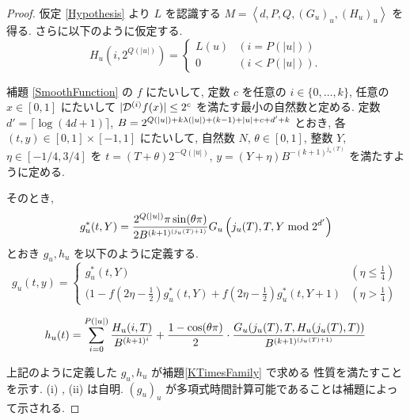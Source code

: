  \begin{proof}
  仮定 \ref{Hypothesis} より $L$ を認識する 
  $M = \left< d, P, Q,(G_u)_u,(H_u)_u \right>$
  を得る.
  さらに以下のように仮定する.
  \begin{equation}
   H_u(i, 2^{Q(|u|)}) = \begin{cases}
			L(u) & (i=P(|u|)) \\
			0 & (i<P(|u|)).
			\end{cases}
  \end{equation}

    補題 \ref{SmoothFunction} の $f$ にたいして, 
 定数 $c$ を任意の $i \in \{0, \dots, k\}$, 任意の $x \in [0,1]$ にたいして $|\mathcal D^{(i)} f(x)| \le 2^c$ を満たす最小の自然数と定める.
 定数 $d' = \lceil \log (4d + 1) \rceil$, 
 $B = 2^{{Q(|u|)} + k {\lambda(|u|)} + (k - 1) + |u| + c + d' + k}$ とおき, 
 各 $(t, y) \in [0,1] \times [-1, 1]$ にたいして,
 自然数 $N$, $\theta \in [0,1]$, 整数 $Y$, $\eta \in [-1/4, 3/4]$ を
 $t = (T + \theta)2^{-Q(|u|)}$, $y = (Y + \eta)B^{-(k+1)^{j_u(T)}}$ 
  を満たすように定める.
 
 そのとき,
 \begin{equation}
  g^*_u(t, Y) = \frac{2^{Q(|u|)} \pi \sin (\theta\pi)}{2 B^{(k+1)^{(j_u(T)+1)}}}
   G_u\left( j_u(T), T, Y \bmod 2^{d'} \right)
 \end{equation}
 とおき $g_u, h_u$ を以下のように定義する.
 \begin{equation}
  g_u(t,y) 
  = \begin{cases}
     g^*_u(t, Y)& (\eta \le \frac 1 4) \\
     ( 1-f \left( 2\eta - \frac 1 2 \right)g^*_u(t, Y) 
     + f \left( 2\eta -  \frac 1 2 \right) g^*_u(t, Y+1)
     & (\eta > \frac 1 4)
    \end{cases}
  \label{ktimes:eq:gu}
 \end{equation}

 \begin{equation} 
  h_u(t) = \sum^{{P(|u|)}}_{i=0} \frac{H_u(i, T)}{B^{(k+1)^i}}
  + \frac{1-\cos(\theta\pi)}{2} 
  \cdot \frac{G_u(j_u(T), T, H_u(j_u(T), T))}{B^{(k+1)^{(j_u(T)+1)}}}
  \label{ktimes:eq:hu}
 \end{equation}

 上記のように定義した $g_u, h_u$ が補題\ref{KTimesFamily} で求める
 性質を満たすことを示す. (i) , (ii) は自明. 
 $(g_u)_u$ が多項式時間計算可能であることは補題によって示される.


\end{proof}
